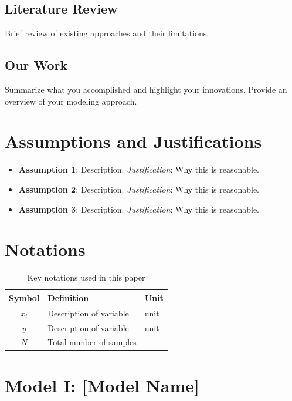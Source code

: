 \documentclass[12pt]{article}
\begin{document}
\subsection{Literature Review}
Brief review of existing approaches and their limitations.

\subsection{Our Work}
Summarize what you accomplished and highlight your innovations.
Provide an overview of your modeling approach.

\section{Assumptions and Justifications}

\begin{itemize}[leftmargin=*]
    \item \textbf{Assumption 1}: Description. \textit{Justification}: Why this is reasonable.
    \item \textbf{Assumption 2}: Description. \textit{Justification}: Why this is reasonable.
    \item \textbf{Assumption 3}: Description. \textit{Justification}: Why this is reasonable.
\end{itemize}

\section{Notations}

\begin{table}[H]
\centering
\begin{tabular}{c|l|l}
\toprule
\textbf{Symbol} & \textbf{Definition} & \textbf{Unit} \\
\midrule
$x_i$ & Description of variable & unit \\
$y$ & Description of variable & unit \\
$N$ & Total number of samples & — \\
\bottomrule
\end{tabular}
\caption{Key notations used in this paper}
\label{tab:notations}
\end{table}

\section{Model I: [Model Name]}
\end{document}
